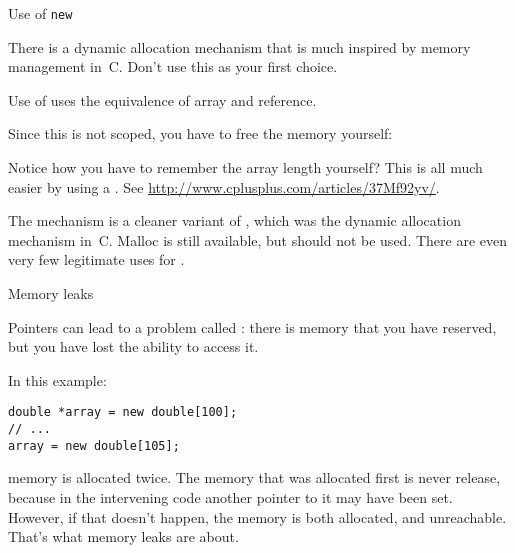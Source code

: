  {Use of \texttt{new}}
\label{sec:cnew}

\prerequisite{\ref{sec:arraypointer}}

There is a dynamic allocation mechanism that is much inspired by
memory management in~C. Don't use this as your first choice.

Use of  uses the 
equivalence of array and reference.
%

Since this is not scoped, you have to free the memory yourself:
%

Notice how you have to remember the array length yourself? This is all
much easier by using a . See
\url{http://www.cplusplus.com/articles/37Mf92yv/}.

The  mechanism is a cleaner variant of ,
which was the dynamic allocation mechanism in~C. Malloc is still
available, but should not be used. There are even very few legitimate
uses for .


 {Memory leaks}
\label{sec:memleak}

Pointers can lead to a problem called :
there is memory that you have reserved, but you have lost the ability
to access it.

In this example:
\begin{verbatim}
double *array = new double[100];
// ...
array = new double[105];
\end{verbatim}
memory is allocated twice. The memory that was allocated first is
never release, because in the intervening code another pointer to it
may have been set. However, if that doesn't happen, the memory is both
allocated, and unreachable. That's what memory leaks are about.


